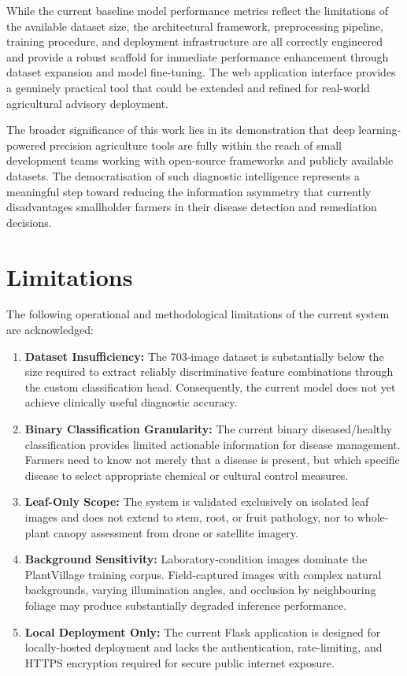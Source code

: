 \documentclass[12pt,a4paper]{report}
\begin{document}
While the current baseline model performance metrics reflect the limitations of the available dataset size, the architectural framework, preprocessing pipeline, training procedure, and deployment infrastructure are all correctly engineered and provide a robust scaffold for immediate performance enhancement through dataset expansion and model fine-tuning. The web application interface provides a genuinely practical tool that could be extended and refined for real-world agricultural advisory deployment.

The broader significance of this work lies in its demonstration that deep learning-powered precision agriculture tools are fully within the reach of small development teams working with open-source frameworks and publicly available datasets. The democratisation of such diagnostic intelligence represents a meaningful step toward reducing the information asymmetry that currently disadvantages smallholder farmers in their disease detection and remediation decisions.

\section{Limitations}

The following operational and methodological limitations of the current system are acknowledged:

\begin{enumerate}[label=\arabic*., itemsep=6pt]
    \item \textbf{Dataset Insufficiency:} The 703-image dataset is substantially below the size required to extract reliably discriminative feature combinations through the custom classification head. Consequently, the current model does not yet achieve clinically useful diagnostic accuracy.

    \item \textbf{Binary Classification Granularity:} The current binary diseased/healthy classification provides limited actionable information for disease management. Farmers need to know not merely that a disease is present, but which specific disease to select appropriate chemical or cultural control measures.

    \item \textbf{Leaf-Only Scope:} The system is validated exclusively on isolated leaf images and does not extend to stem, root, or fruit pathology, nor to whole-plant canopy assessment from drone or satellite imagery.

    \item \textbf{Background Sensitivity:} Laboratory-condition images dominate the PlantVillage training corpus. Field-captured images with complex natural backgrounds, varying illumination angles, and occlusion by neighbouring foliage may produce substantially degraded inference performance.

    \item \textbf{Local Deployment Only:} The current Flask application is designed for locally-hosted deployment and lacks the authentication, rate-limiting, and HTTPS encryption required for secure public internet exposure.
\end{enumerate}
\end{document}

